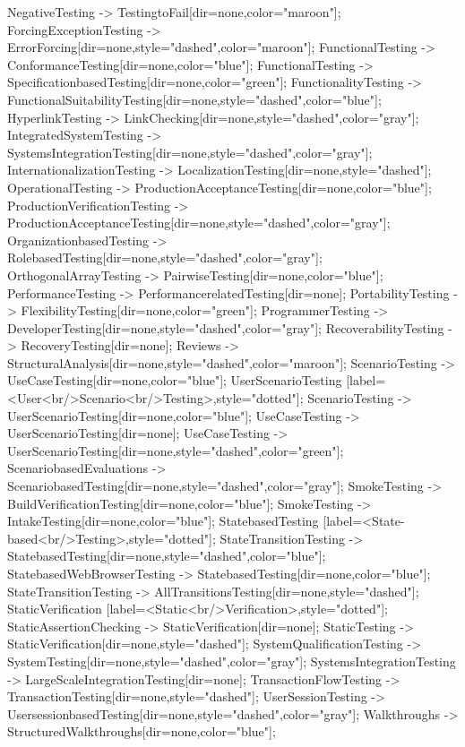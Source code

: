\documentclass{article}
\begin{document}
{NegativeTesting -> TestingtoFail[dir=none,color="maroon"];
ForcingExceptionTesting -> ErrorForcing[dir=none,style="dashed",color="maroon"];
FunctionalTesting -> ConformanceTesting[dir=none,color="blue"];
FunctionalTesting -> SpecificationbasedTesting[dir=none,color="green"];
FunctionalityTesting -> FunctionalSuitabilityTesting[dir=none,style="dashed",color="blue"];
HyperlinkTesting -> LinkChecking[dir=none,style="dashed",color="gray"];
IntegratedSystemTesting -> SystemsIntegrationTesting[dir=none,style="dashed",color="gray"];
InternationalizationTesting -> LocalizationTesting[dir=none,style="dashed"];
OperationalTesting -> ProductionAcceptanceTesting[dir=none,color="blue"];
ProductionVerificationTesting -> ProductionAcceptanceTesting[dir=none,style="dashed",color="gray"];
OrganizationbasedTesting -> RolebasedTesting[dir=none,style="dashed",color="gray"];
OrthogonalArrayTesting -> PairwiseTesting[dir=none,color="blue"];
PerformanceTesting -> PerformancerelatedTesting[dir=none];
PortabilityTesting -> FlexibilityTesting[dir=none,color="green"];
ProgrammerTesting -> DeveloperTesting[dir=none,style="dashed",color="gray"];
RecoverabilityTesting -> RecoveryTesting[dir=none];
Reviews -> StructuralAnalysis[dir=none,style="dashed",color="maroon"];
ScenarioTesting -> UseCaseTesting[dir=none,color="blue"];
UserScenarioTesting [label=<User<br/>Scenario<br/>Testing>,style="dotted"];
ScenarioTesting -> UserScenarioTesting[dir=none,color="blue"];
UseCaseTesting -> UserScenarioTesting[dir=none];
UseCaseTesting -> UserScenarioTesting[dir=none,style="dashed",color="green"];
ScenariobasedEvaluations -> ScenariobasedTesting[dir=none,style="dashed",color="gray"];
SmokeTesting -> BuildVerificationTesting[dir=none,color="blue"];
SmokeTesting -> IntakeTesting[dir=none,color="blue"];
StatebasedTesting [label=<State-based<br/>Testing>,style="dotted"];
StateTransitionTesting -> StatebasedTesting[dir=none,style="dashed",color="blue"];
StatebasedWebBrowserTesting -> StatebasedTesting[dir=none,color="blue"];
StateTransitionTesting -> AllTransitionsTesting[dir=none,style="dashed"];
StaticVerification [label=<Static<br/>Verification>,style="dotted"];
StaticAssertionChecking -> StaticVerification[dir=none];
StaticTesting -> StaticVerification[dir=none,style="dashed"];
SystemQualificationTesting -> SystemTesting[dir=none,style="dashed",color="gray"];
SystemsIntegrationTesting -> LargeScaleIntegrationTesting[dir=none];
TransactionFlowTesting -> TransactionTesting[dir=none,style="dashed"];
UserSessionTesting -> UsersessionbasedTesting[dir=none,style="dashed",color="gray"];
Walkthroughs -> StructuredWalkthroughs[dir=none,color="blue"];

}
\end{document}
